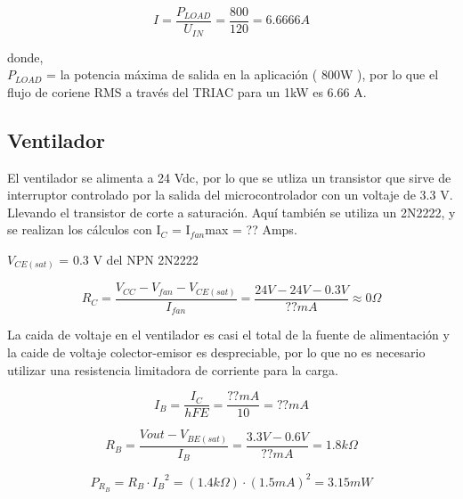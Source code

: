             \begin{equation}
                I   
                =   \frac{ P_{LOAD} }{ U_{IN} }  
                =   \frac{800}{120}    
                =   6.6666 A
            \end{equation}
        
            donde,\\
            $P_{LOAD}$ = la potencia máxima de salida en la aplicación ( 800W ), por lo que el flujo de coriene RMS a través del TRIAC para un 1kW es 6.66 A.

        
\subsection{Ventilador}
    El ventilador se alimenta a 24 Vdc, por lo que se utliza un transistor que sirve de interruptor controlado por la salida del microcontrolador con un voltaje de 3.3 V. Llevando el transistor de corte a saturación. Aquí también se utiliza un 2N2222, y se realizan los cálculos con I$_{C}$ = I$_{fan}$max = ?? Amps.
    
     $V_{CE(sat)}$ = 0.3 V del NPN 2N2222
    
    \begin{equation}
        R_{C} 
        =   \frac { V_{CC} - V_{fan} - V_{CE(sat)} } { I_{fan} }
        =   \frac { 24V - 24V - 0.3V } { ??mA }
        \approx   0 \Omega
    \end{equation}
    
    \begin{center}
        La caida de voltaje en el ventilador es casi el total de la fuente de alimentación y la caide de voltaje colector-emisor es despreciable, por lo que no es necesario utilizar una resistencia limitadora de corriente para la carga.\\
    \end{center}
    
    \begin{equation}
        I_{B}   
        =   \frac { I_{C} } { hFE }
        =   \frac { ??mA } { 10 }
        =   ??mA
    \end{equation}

    \begin{equation}
        R_{B}   
        =   \frac { Vout - V_{BE(sat)} } { I_{B} }
        =   \frac { 3.3V - 0.6V } { ?? mA }
        =   1.8k\Omega
    \end{equation}
    
    \begin{equation}
        P_{R_{B}}
        =   R_{B} \cdot {I_{B}}^2
        =   (1.4k\Omega) \cdot (1.5mA)^2
        =   3.15mW
    \end{equation}
    
